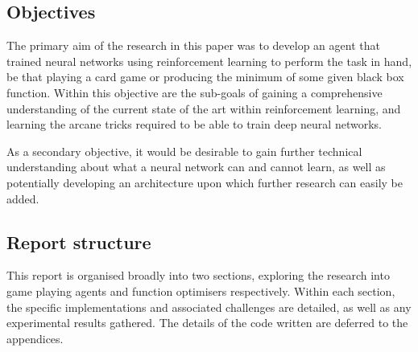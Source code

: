 \subsection{Objectives}
The primary aim of the research in this paper was to develop an agent that trained neural networks using reinforcement learning to perform the task in hand, be that playing a card game or producing the minimum of some given black box function. Within this objective are the sub-goals of gaining a comprehensive understanding of the current state of the art within reinforcement learning, and learning the arcane tricks required to be able to train deep neural networks.

As a secondary objective, it would be desirable to gain further technical understanding about what a neural network can and cannot learn, as well as potentially developing an architecture upon which further research can easily be added.

\subsection{Report structure}
This report is organised broadly into two sections, exploring the research into game playing agents and function optimisers respectively. Within each section, the specific implementations and associated challenges are detailed, as well as any experimental results gathered. The details of the code written are deferred to the appendices.